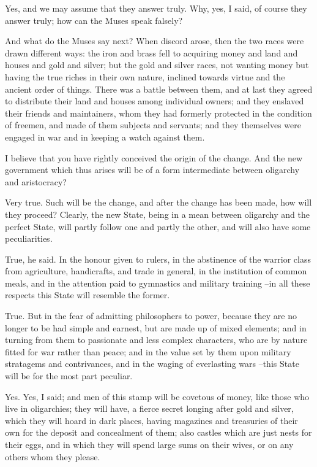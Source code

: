 Yes, and we may assume that they answer truly.
Why, yes, I said, of course they answer truly; how can the Muses speak falsely?

And what do the Muses say next?
When discord arose, then the two races were drawn different ways: the iron and brass fell to acquiring money and land and houses and gold and silver; but the gold and silver races, not wanting money but having the true riches in their own nature, inclined towards virtue and the ancient order of things. There was a battle between them, and at last they agreed to distribute their land and houses among individual owners; and they enslaved their friends and maintainers, whom they had formerly protected in the condition of freemen, and made of them subjects and servants; and they themselves were engaged in war and in keeping a watch against them.

I believe that you have rightly conceived the origin of the change.
And the new government which thus arises will be of a form intermediate between oligarchy and aristocracy?

Very true.
Such will be the change, and after the change has been made, how will they proceed? Clearly, the new State, being in a mean between oligarchy and the perfect State, will partly follow one and partly the other, and will also have some peculiarities.

True, he said.
In the honour given to rulers, in the abstinence of the warrior class from agriculture, handicrafts, and trade in general, in the institution of common meals, and in the attention paid to gymnastics and military training --in all these respects this State will resemble the former.

True.
But in the fear of admitting philosophers to power, because they are no longer to be had simple and earnest, but are made up of mixed elements; and in turning from them to passionate and less complex characters, who are by nature fitted for war rather than peace; and in the value set by them upon military stratagems and contrivances, and in the waging of everlasting wars --this State will be for the most part peculiar.

Yes.
Yes, I said; and men of this stamp will be covetous of money, like those who live in oligarchies; they will have, a fierce secret longing after gold and silver, which they will hoard in dark places, having magazines and treasuries of their own for the deposit and concealment of them; also castles which are just nests for their eggs, and in which they will spend large sums on their wives, or on any others whom they please.

